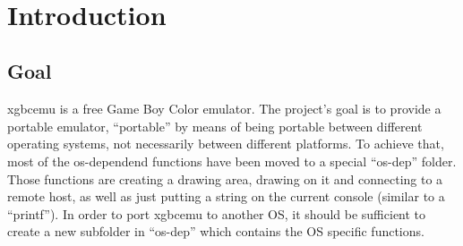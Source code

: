 \documentclass[fleqn,english,openany]{scrbook}
\begin{document}
\renewcommand{\headrulewidth}{0.5pt}
\renewcommand{\footrulewidth}{0pt}
\newcommand{\currentchaptername}{}
\newcommand{\currentsectionname}{}
\newcommand{\currentsubsectionname}{}

\renewcommand{\chaptermark}[1]
{
    \label{sec:#1}
    \renewcommand{\currentchaptername}{#1}
    \thispagestyle{empty}
    \rhead[Chapter \thechapter]{\thepage}
    \lhead[\thepage]{#1}
}

\renewcommand{\sectionmark}[1]
{
    \label{sec:\currentchaptername:#1}
    \renewcommand{\currentsectionname}{#1}
}

\renewcommand{\subsectionmark}[1]
{
    \label{sec:\currentchaptername:\currentsectionname:#1}
    \renewcommand{\currentsubsectionname}{#1}
}

\renewcommand{\subsubsectionmark}[1]
{
    \label{sec:\currentchaptername:\currentsectionname:\currentsubsectionname:#1}
}


\makeatletter
\let\ps@plain\ps@fancy
\makeatother

\tableofcontents



\ifodd\thepage
    \newpage

    ~
\fi

\newpage

\setcounter{page}{1}

\lhead[\thepage]{}
\rhead[]{\thepage}


\chapter{Introduction}

\section{Goal}

xgbcemu is a free Game Boy Color emulator. The project's goal is to provide a portable emulator, “portable” by means of
being portable between different operating systems, not necessarily between different platforms. To achieve that, most
of the os-dependend functions have been moved to a special “os-dep” folder. Those functions are creating a drawing area,
drawing on it and connecting to a remote host, as well as just putting a string on the current console (similar to a
“printf”). In order to port xgbcemu to another OS, it should be sufficient to create a new subfolder in “os-dep” which
contains the OS specific functions.
\end{document}
